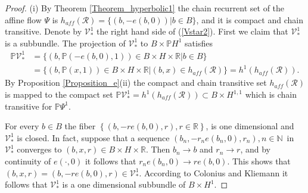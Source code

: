 	\begin{proof}
		(i) By Theorem \ref{Theorem_hyperbolic1} the chain recurrent set of the affine
		flow $\Psi$ is $h_{aff}(\mathcal{R})=\{(b,-e(b,0))\left\vert b\in B\right.
		\}$, and it is compact and chain transitive. Denote by $\mathcal{V}_{\ast}%
		^{1}$ the right hand side of (\ref{Vstar2}). First we claim that
		$\mathcal{V}_{\ast}^{1}$ is a subbundle. The projection of $\mathcal{V}_{\ast
		}^{1}$ to $B\times\mathbb{P}H^{1}$ satisfies
		\begin{align*}
			\mathbb{P}\mathcal{V}_{\ast}^{1}  &  =\{(b,\mathbb{P}\left(  -e(b,0),1\right)
			)\in B\times H\times\mathbb{R}\left\vert b\in B\right.  \}\\
			&  =\{(b,\mathbb{P}\left(  x,1\right)  )\in B\times H\times\mathbb{R}%
			\left\vert (b,x)\in h_{aff}(\mathcal{R})\right.  \}=h^{1}(h_{aff}%
			(\mathcal{R})).
		\end{align*}
		By Proposition \ref{Proposition_e}(ii) the compact and chain transitive set
		$h_{aff}(\mathcal{R})$ is mapped to the compact set $\mathbb{P}\mathcal{V}%
		_{\ast}^{1}=h^{1}(h_{aff}(\mathcal{R}))\subset B\times H^{1,1}$ which is chain
		transitive for $\mathbb{P}\Psi^{1}$.
		
		For every $b\in B$ the fiber $\left\{  (b,-re(b,0),r),r\in\mathbb{R}\right\}
		$, is one dimensional and $\mathcal{V}_{\ast}^{1}$ is closed. In fact, suppose
		that a sequence $(b_{n},-r_{n}e(b_{n},0),r_{n}),n\in\mathbb{N\,}$ in
		$\mathcal{V}_{\ast}^{1}$ converges to $(b,x,r)\in B\times H\times\mathbb{R}$.
		Then $b_{n}\rightarrow b$ and $r_{n}\rightarrow r$, and by continuity of
		$e(\cdot,0)$ it follows that $r_{n}e(b_{n},0)\rightarrow re(b,0)$. This shows
		that $(b,x,r)=(b,-re(b,0),r)\in\mathcal{V}_{\ast}^{1}$. According to Colonius
		and Kliemann \cite[Lemma B.1.13]{ColK00} it follows that $\mathcal{V}_{\ast
		}^{1}$ is a one dimensional subbundle of $B\times H^{1}$.
		

\end{proof}
